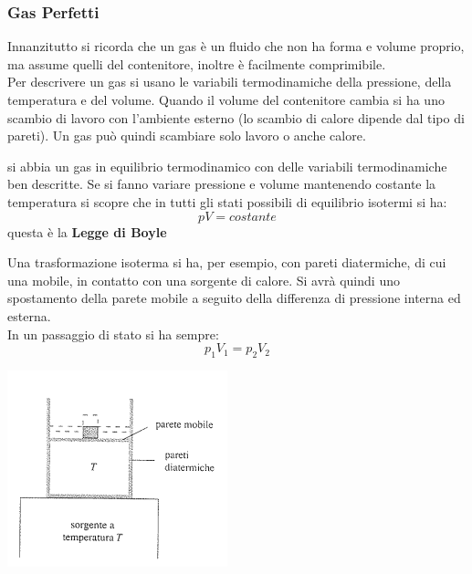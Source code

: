 \documentclass[a4paper,12pt, oneside]{book}
\begin{document}
\subsubsection{Gas Perfetti}
Innanzitutto si ricorda che un gas è un fluido che non ha forma e volume proprio, ma assume quelli del contenitore, inoltre è facilmente comprimibile. \\
Per descrivere un gas si usano le variabili termodinamiche della pressione, della temperatura e del volume. Quando il volume del contenitore cambia si ha uno scambio di lavoro con l'ambiente esterno (lo scambio di calore dipende dal tipo di pareti). Un gas può quindi scambiare solo lavoro o anche calore.\\
\begin{definizione}
si abbia un gas in equilibrio termodinamico con delle variabili termodinamiche ben descritte. Se si fanno variare pressione e volume mantenendo costante la temperatura si scopre che in tutti gli stati possibili di equilibrio isotermi si ha:
$$pV=costante$$
questa è la \textbf{Legge di Boyle}
\end{definizione}
Una trasformazione isoterma si ha, per esempio, con pareti diatermiche, di cui una mobile, in contatto con una sorgente di calore. Si avrà quindi uno spostamento della parete mobile a seguito della differenza di pressione interna ed esterna.\\
In un passaggio di stato si ha sempre:
$$p_1V_1=p_2V_2$$
\begin{center}
\includegraphics[scale=0.5]{img/term2.png}
\end{center}
\end{document}
